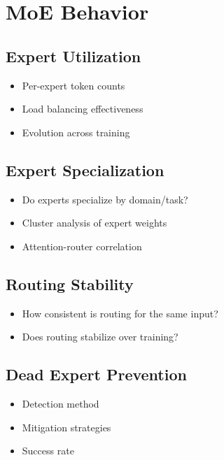 \section{MoE Behavior}
    \subsection{Expert Utilization}
        \begin{itemize}
            \item Per-expert token counts
            \item Load balancing effectiveness
            \item Evolution across training
        \end{itemize}
    
    \subsection{Expert Specialization}
        \begin{itemize}
            \item Do experts specialize by domain/task?
            \item Cluster analysis of expert weights
            \item Attention-router correlation
        \end{itemize}

    \subsection{Routing Stability}
        \begin{itemize}
            \item How consistent is routing for the same input?
            \item Does routing stabilize over training?
        \end{itemize}

    \subsection{Dead Expert Prevention}
        \begin{itemize}
            \item Detection method
            \item Mitigation strategies
            \item Success rate
        \end{itemize}

